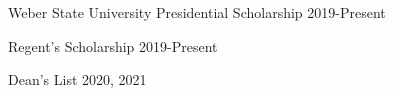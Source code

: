 Weber State University Presidential Scholarship \hfill 2019-Present

Regent's Scholarship \hfill 2019-Present

Dean's List \hfill 2020, 2021

